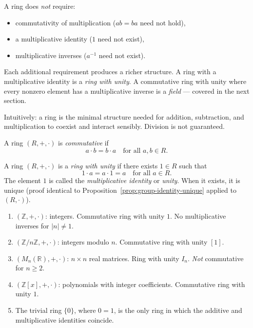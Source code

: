 \begin{remark}
A ring does \emph{not} require:
\begin{itemize}
  \item commutativity of multiplication ($ab = ba$ need not hold),
  \item a multiplicative identity ($1$ need not exist),
  \item multiplicative inverses ($a^{-1}$ need not exist).
\end{itemize}
Each additional requirement produces a richer structure.
A ring with a multiplicative identity is a \emph{ring with unity}.
A commutative ring with unity where every nonzero element has a
multiplicative inverse is a \emph{field} --- covered in the next section.

Intuitively: a ring is the minimal structure needed for addition,
subtraction, and multiplication to coexist and interact sensibly.
Division is not guaranteed.
\end{remark}

\begin{definition}
\label{def:notes-rings-definition-l65}
A ring $(R, +, \cdot)$ is \emph{commutative} if
\[
a \cdot b = b \cdot a \quad \text{for all } a, b \in R.
\]
\end{definition}

\begin{definition}
\label{def:notes-rings-definition-l72}
A ring $(R, +, \cdot)$ is a \emph{ring with unity} if there exists
$1 \in R$ such that
\[
1 \cdot a = a \cdot 1 = a \quad \text{for all } a \in R.
\]
The element $1$ is called the \emph{multiplicative identity} or \emph{unity}.
When it exists, it is unique (proof identical to
Proposition~\ref{prop:group-identity-unique} applied to $(R, \cdot)$).
\end{definition}

\begin{example}
\begin{enumerate}[label=(\roman*)]
  \item $(\mathbb{Z}, +, \cdot)$: integers.
        Commutative ring with unity $1$.
        No multiplicative inverses for $|n| \neq 1$.

  \item $(\mathbb{Z}/n\mathbb{Z}, +, \cdot)$: integers modulo $n$.
        Commutative ring with unity $[1]$.

  \item $(M_n(\mathbb{R}), +, \cdot)$: $n \times n$ real matrices.
        Ring with unity $I_n$. \emph{Not} commutative for $n \geq 2$.

  \item $(\mathbb{Z}[x], +, \cdot)$: polynomials with integer coefficients.
        Commutative ring with unity $1$.

  \item The trivial ring $\{0\}$, where $0 = 1$, is the only ring
        in which the additive and multiplicative identities coincide.
\end{enumerate}
\end{example}
